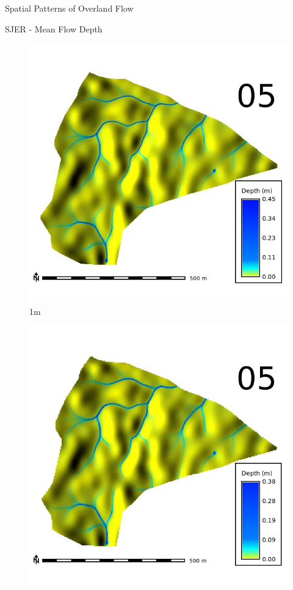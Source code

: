 \documentclass[
  ignorenonframetext,
]{beamer}
\begin{document}
\begin{frame}{Spatial Patterns of Overland Flow}
\begin{block}{SJER - Mean Flow Depth}
\begin{figure}[H]
{\centering \includegraphics{../output/SJER/sensitivity_1/SJER_depth_1_025_s_average.webp}

}

\caption{1m}

\end{figure}%

\begin{figure}[H]

{\centering \includegraphics{../output/SJER/sensitivity_1/SJER_depth_3_025_s_average.webp}

}
\end{figure}
\end{block}
\end{frame}
\end{document}
